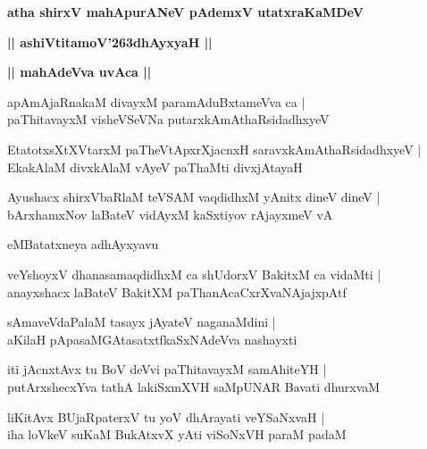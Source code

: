 \documentclass[twoside,12pt,openright]{book}
\def\S{\char'263}
\newcounter{shloka}[chapter]
\def\uvaca#1{\centerline{{\large\textbf{#1}}}}
\begin{document}
\begin{center}
{\LARGE\bfseries atha shirxV mahApurANeV pAdemxV utatxraKaMDeV}
\end{center}

\begin{center}
{\LARGE\bfseries || ashiVtitamoV\S dhAyxyaH || }
\end{center}

\uvaca{|| mahAdeVva uvAca ||}

\begin{shloka}%
apAmAjaRnakaM divayxM paramAduBxtameVva ca |\\
paThitavayxM visheVSeVNa putarxkAmAthaRsidadhxyeV 
\end{shloka}

\begin{shloka}%
EtatotxsXtXVtarxM paTheVtApxrXjacnxH saravxkAmAthaRsidadhxyeV |\\
EkakAlaM divxkAlaM vAyeV paThaMti divxjAtayaH 
\end{shloka}

\begin{shloka}%
Ayushacx shirxVbaRlaM teVSAM vaqdidhxM yAnitx dineV dineV |\\
bArxhamxNov laBateV vidAyxM kaSxtiyov rAjayxmeV vA 
\end{shloka}

\begin{center}
eMBatatxneya adhAyxyavu
\end{center}

\begin{shloka}%
veYshoyxV dhanasamaqdidhxM ca shUdorxV BakitxM ca vidaMti |\\
anayxshacx laBateV BakitXM paThanAcaCxrXvaNAjajxpAtf 
\end{shloka}

\begin{shloka}%
sAmaveVdaPalaM tasayx jAyateV naganaMdini |\\
aKilaH pApasaMGAtasatxtfkaSxNAdeVva nashayxti
\end{shloka}

\begin{shloka}%
iti jAcnxtAvx tu BoV deVvi paThitavayxM samAhiteYH |\\
putArxshecxYva tathA lakiSxmXVH saMpUNAR Bavati dhurxvaM 
\end{shloka}

\begin{shloka}%
liKitAvx BUjaRpaterxV tu yoV dhArayati veYSaNxvaH |\\
iha loVkeV suKaM BukAtxvX yAti viSoNxVH paraM padaM 
\end{shloka}
\end{document}
